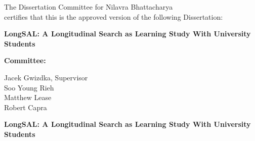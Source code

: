 \documentclass[letterpaper, nobind]{templates/ociamthesis}
\begin{document}
\begin{romanpages}



\thispagestyle{empty} %
\begin{center}
  The Dissertation Committee for Nilavra Bhattacharya\\
  certifies that this is the approved version of the following Dissertation:\\
  \vspace*{30pt}
  \begin{spacing}{2}
    {\Large{\textbf{LongSAL: A Longitudinal Search as Learning Study With University Students}}}
  \end{spacing}
\end{center}

\vspace*{55pt}

\phantom{x}\hspace{45ex} {\large{\textbf{Committee:}}}\\

\begin{flushright}
  Jacek Gwizdka, Supervisor\\
  \vspace*{24pt}
  Soo Young Rieh\\
  \vspace*{24pt}
  Matthew Lease\\
  \vspace*{24pt}
  Robert Capra
\end{flushright}


\newpage
\thispagestyle{empty} %
\begin{center}
  
  \begin{spacing}{2}
    {\Large{\textbf{LongSAL: A Longitudinal Search as Learning Study With University Students}}}
  \end{spacing}
  

\end{center}
\end{romanpages}
\end{document}
